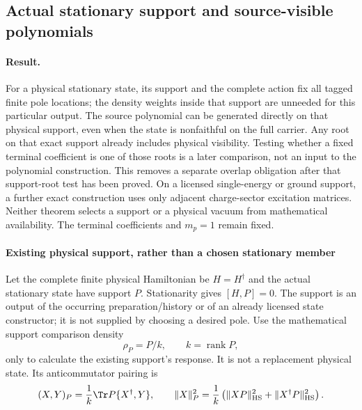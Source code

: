 \documentclass[12pt,a4paper]{article}
\begin{document}


\subsection{Actual stationary support and source-visible polynomials}
\label{p4:sec:v2169-support-polynomial}
\paragraph{Result.}
For a physical stationary state, its support and the complete action fix all
tagged finite pole locations; the density weights inside that support are
unneeded for this particular output. The source polynomial can be generated
directly on that physical support, even when the state is nonfaithful on the
full carrier. Any root on that exact support already includes physical
visibility. Testing whether a fixed terminal coefficient is one of those roots
is a later comparison, not an input to the polynomial construction. This
removes a separate overlap obligation after that support-root test has been
proved. On a licensed single-energy or ground support, a further exact
construction uses only adjacent charge-sector excitation matrices.
Neither theorem selects a support or a physical vacuum from mathematical
availability. The terminal coefficients and $m_p=1$ remain fixed.



\paragraph{Existing physical support, rather than a chosen stationary member}
Let the complete finite physical Hamiltonian be $H=H^\dagger$ and the actual
stationary state have support $P$. Stationarity gives $[H,P]=0$. The support
is an output of the occurring preparation/history or of an already licensed
state constructor; it is not supplied by choosing a desired pole.
Use the mathematical support comparison density
\[
 \rho_P=P/k,\qquad k=\operatorname{rank} P,
\]
only to calculate the existing support's response. It is not a replacement
physical state. Its anticommutator pairing is
\begin{equation}
 (X,Y)_P=\frac1k\Tr P\{X^\dagger,Y\},\qquad
 \|X\|_P^2=\frac1k
       \left(\|XP\|_{\rm HS}^2+\|X^\dagger P\|_{\rm HS}^2\right).
 \label{p4:eq:v2169-b10-s1}
\end{equation}
\end{document}
